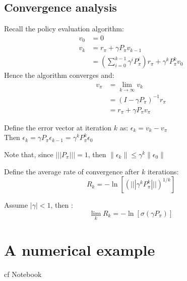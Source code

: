 \documentclass{beamer}
\begin{document}
    \subsection{Convergence analysis}
    
	    \begin{frame}
		    Recall the policy evaluation algorithm:
		    \begin{align*}
		    v_{0}&=0\\
		    v_{k} & = r_{\pi} + \gamma P_{\pi} v_{k-1} \\
		    & = \left(\sum_{i=0}^{k-1} \gamma^{i} P_{\pi}^{i}\right) r_{\pi}  + \gamma^{k} P_{\pi}^{k}v_{0}
		    \end{align*}
		    Hence the algorithm converges and:
		    \begin{align*}
			v_{\pi} & = \lim_{k \rightarrow \infty} v_{k}\\
			 &= (I-\gamma P_{\pi})^{-1} r_{\pi} \\
			 &= r_{\pi} + \gamma P_{\pi} v_{\pi}		    
		    \end{align*}
	    \end{frame}
	    
	    \begin{frame}
	    	\begin{definition}
		    	Define the error vector at iteration $k$ as: $\epsilon_{k} = v_{k}-v_{\pi}$\\
		    	Then $\epsilon_{k} = \gamma P_{\pi} \epsilon_{k-1} = \gamma^{k} P_{\pi}^{k} \epsilon_{0}$
	    	\end{definition}
	    	
	    	Note that, since $||| P_{\pi} ||| = 1$, then $\| \epsilon_{k} \| \leq \gamma^{k} \| \epsilon_{0} \|	$
	    	\begin{definition}
		    	Define the average rate of convergence after $k$ iterations:
		    	\[
					R_{k} = - \ln \left[ ( |||\gamma^{k} P_{\pi}^{k} ||| )^{1/k} \right]    	
		    	\]
	    	\end{definition}
	    	\begin{theorem}
	    		Assume $|\gamma| < 1$, then :
	    		\[
					\lim_{k} R_{k} = - \ln \left[ \sigma(\gamma P_{\pi}) \right]
	    		\]
	    	\end{theorem}
	    	
	    \end{frame}

\section{A numerical example}
	\begin{frame}
		cf Notebook
	\end{frame}
\end{document}
